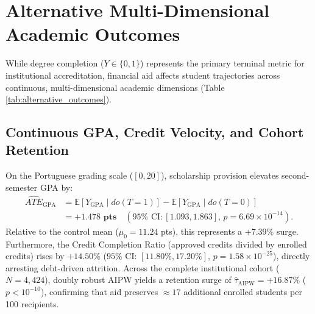 \section{Alternative Multi-Dimensional Academic Outcomes}
\label{sec:adv_alternative_outcomes}

While degree completion ($Y \in \{0, 1\}$) represents the primary terminal metric for institutional accreditation, financial aid affects student trajectories across continuous, multi-dimensional academic dimensions (Table \ref{tab:alternative_outcomes}).

\begin{table}[htbp]
    \centering
    \small
    \caption{Causal Treatment Effects Across Multi-Dimensional Academic Outcomes.}
    \label{tab:alternative_outcomes}
\end{table}

\subsection{Continuous GPA, Credit Velocity, and Cohort Retention}

On the Portuguese grading scale ($[0, 20]$), scholarship provision elevates second-semester GPA by:
\begin{equation}
\begin{aligned}
    \widehat{ATE}_{\text{GPA}} &= \mathbb{E}[Y_{\text{GPA}} \mid do(T=1)] - \mathbb{E}[Y_{\text{GPA}} \mid do(T=0)] \\
    &= \mathbf{+1.478 \text{ pts}} \quad (95\% \text{ CI}: [1.093, 1.863], \, p = 6.69 \times 10^{-14}).
\end{aligned}
\label{eq:ate_gpa}
\end{equation}
Relative to the control mean ($\mu_0 = 11.24$ pts), this represents a $+7.39\%$ surge. Furthermore, the Credit Completion Ratio (approved credits divided by enrolled credits) rises by $\mathbf{+14.50\%}$ ($95\%$ CI: $[11.80\%, 17.20\%]$, $p = 1.58 \times 10^{-25}$), directly arresting debt-driven attrition. Across the complete institutional cohort ($N = 4,424$), doubly robust AIPW yields a retention surge of $\hat{\tau}_{\text{AIPW}} = \mathbf{+16.87\%}$ ($p < 10^{-10}$), confirming that aid preserves $\approx 17$ additional enrolled students per 100 recipients.
